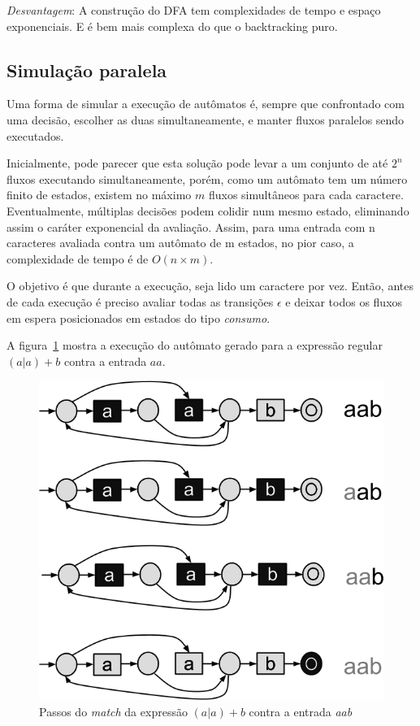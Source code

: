 \documentclass[a4paper,12pt,oneside,onecolumn]{uerj}
\begin{document}
\emph{Desvantagem}: A construção do DFA tem complexidades de tempo e espaço exponenciais. E é bem mais complexa do que o backtracking puro.

\subsection{Simulação paralela}

Uma forma de simular a execução de autômatos é, sempre que confrontado com uma decisão, escolher as duas simultaneamente, e manter fluxos paralelos sendo executados. 

Inicialmente, pode parecer que esta solução pode levar a um conjunto de até $2^n$ fluxos executando simultaneamente, porém, como um autômato tem um número finito de estados, existem no máximo $m$ fluxos simultâneos para cada caractere. Eventualmente, múltiplas decisões podem colidir num mesmo estado, eliminando assim o caráter exponencial da avaliação. Assim, para uma entrada com n caracteres avaliada contra um autômato de m estados, no pior caso, a complexidade de tempo é de $O(n \times m)$.

O objetivo é que durante a execução, seja lido um caractere por vez. Então, antes de cada execução é preciso avaliar todas as transições $\epsilon$ e deixar todos os fluxos em espera posicionados em estados do tipo \emph{consumo}.

A figura~\ref{fig:nfa_simultaneo} mostra a execução do autômato gerado para a expressão regular $(a|a)+b$ contra a entrada $aa$.

\begin{figure}[ht]
  \centering
  \includegraphics[scale=0.5]{figures/nfa_simultaneo.png}
  \caption{Passos do \emph{match} da expressão $(a|a)+b$ contra a entrada \emph{aab}}
  \label{fig:nfa_simultaneo}
\end{figure}
\end{document}
